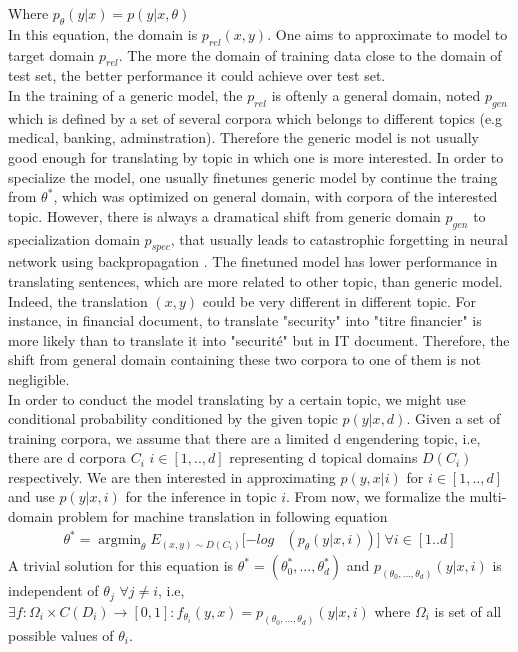 \documentclass[11pt,a4paper]{article}
\DeclareMathOperator*{\argmin}{argmin}
\begin{document}
Where $p_{\theta}(y|x) = p(y|x,\theta)$ \\
In this equation, the domain is $p_{rel}(x,y)$. One aims to approximate to model to target domain $p_{rel}$. The more the domain of training data close to the domain of test set, the better performance it could achieve over test set.\\
In the training of a generic model, the $p_{rel}$ is oftenly a general domain, noted $p_{gen}$ which is defined by a set of several corpora which belongs to different topics (e.g medical, banking, adminstration). Therefore the generic model is not usually good enough for translating by topic in which one is more interested. In order to specialize the model, one usually finetunes generic model by continue the traing from $\theta^*$, which was optimized on general domain, with corpora of the interested topic. However, there is always a dramatical shift from generic domain $p_{gen}$ to specialization domain $p_{spec}$, that usually leads to catastrophic forgetting in neural network using backpropagation \cite{McCloskey1989Catastrophic}. The finetuned model has lower performance in translating sentences, which are more related to other topic, than generic model. Indeed, the translation $(x,y)$ could be very different in different topic. For instance, in financial document, to translate "security" into "titre financier" is more likely than to translate it into "securit\'e" but in IT document. Therefore, the shift from general domain containing these two corpora to one of them is not negligible. \\
In order to conduct the model translating by a certain topic, we might use conditional probability conditioned by the given topic $p(y|x,d)$. Given a set of training corpora, we assume that there are a limited d engendering topic, i.e, there are d corpora $C_i$ $i \in [1,..,d]$ representing d topical domains $D(C_i)$ respectively. We are then interested in approximating $p(y,x|i)$ for $i \in [1,..,d]$ and use $p(y|x,i)$ for the inference in topic $i$. From now, we formalize the multi-domain problem for machine translation in following equation
\begin{equation}
\begin{split}
\theta^* = \argmin_{\theta} E_{(x,y) \sim D(C_{i})} [-log & (p_{\theta}(y|x,i))] \; \forall i \in [1..d]
\end{split}
\end{equation}
A trivial solution for this equation is $\theta^* = (\theta^*_{0},...,\theta^*_{d})$ and $p_{(\theta_{0},...,\theta_d)}(y|x,i)$ is independent of $\theta_{j}$ $\forall j \neq i$, i.e, $\exists f:\Omega_i \times C(D_i) \rightarrow [0,1]: f_{\theta_i}(y,x) = p_{(\theta_{0},...,\theta_d)}(y|x,i)$ where $\Omega_i$ is set of all possible values of $\theta_i$. \\
\end{document}
